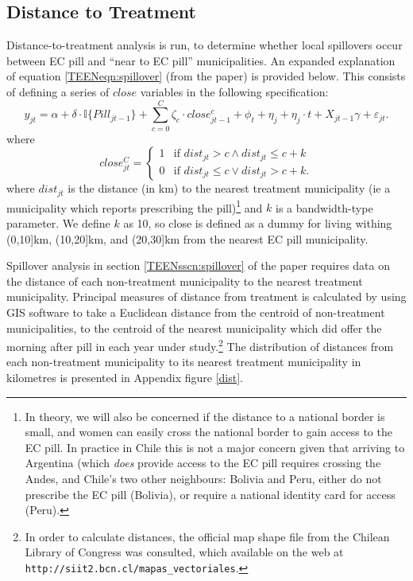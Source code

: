 \documentclass[11pt,subeqn]{article}
\begin{document}
\begin{spacing}{1.4}
\subsection{Distance to Treatment}
Distance-to-treatment analysis is run, to determine whether local spillovers
occur between EC pill and ``near to EC pill'' municipalities.  An expanded
explanation of equation \ref{TEENeqn:spillover} (from the paper) is provided
below.  This consists of defining a series of $close$ variables in the
following specification:
\begin{equation}
 \label{TEENeqn:spillover2}
y_{jt} = \alpha + \delta\cdot \mathbb{I}\{Pill_{jt-1}\} + 
	\sum_{c=0}^C\zeta_c\cdot close^c_{jt-1} + \phi_t + 
\eta_j + \eta_j\cdot t + X_{jt-1}\gamma + \varepsilon_{jt}.
\end{equation}
where
\[
 close^C_{jt} =
  \begin{cases}
   1 & \text{if } dist_{jt} > c \wedge dist_{jt}\leq c+k   \\
   0 & \text{if } dist_{jt} \leq c \vee  dist_{jt}>c+k.
  \end{cases}
\]
where $dist_{jt}$ is the distance (in km) to the nearest treatment municipality 
(ie a municipality which reports prescribing the pill)\footnote{In theory, we
will also be concerned if the distance to a national border is small, and women
can easily cross the national border to gain access to the EC pill.  In practice
in Chile this is not a major concern given that arriving to Argentina (which
\emph{does} provide access to the EC pill requires crossing the Andes, and 
Chile's two other neighbours: Bolivia and Peru, either do not prescribe the EC
pill (Bolivia), or require a national identity card for access (Peru).} and 
$k$ is a bandwidth-type parameter.  We define $k$ as 10, so close is defined
as a dummy for living withing (0,10]km, (10,20]km, and (20,30]km from the
nearest EC pill municipality.

Spillover analysis in section \ref{TEENsscn:spillover} of the paper requires
data on the distance of each non-treatment municipality to the nearest 
treatment municipality.  Principal measures of distance from treatment is 
calculated by using GIS software to take a Euclidean distance from the 
centroid of non-treatment municipalities, to the centroid of the nearest 
municipality which did offer the morning after pill in each year under 
study.\footnote{In order to calculate distances, the official map shape file
from the Chilean Library of Congress was consulted, which available on the
web at \texttt{http://siit2.bcn.cl/mapas_vectoriales}.}  The distribution of
distances from each non-treatment municipality to its nearest treatment 
municipality in kilometres is presented in Appendix figure \ref{dist}.


\end{spacing}
\end{document}
